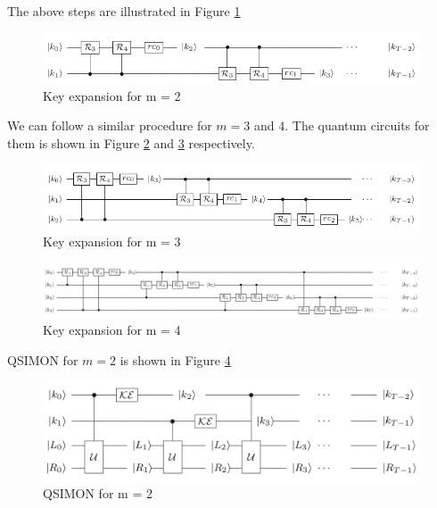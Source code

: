 \documentclass[preprint]{transcrypto}
\begin{document}
The above steps are illustrated in Figure \ref{fig:kem2}

\begin{figure}[h!]
    \centering
    \includegraphics[width=\linewidth]{simon/m2.png}
    \caption{Key expansion for m = 2 \cite{gos}}
    \label{fig:kem2}
\end{figure}

We can follow a similar procedure for $m= 3$ and $4$. The quantum circuits for them is shown in Figure \ref{fig:kem3} and \ref{fig:kem4} respectively.


\begin{figure}[h!]
    \centering
    \includegraphics[width=\linewidth]{simon/m3.png}
    \caption{Key expansion for m = 3 \cite{gos}}
    \label{fig:kem3}
\end{figure}


\begin{figure}[h!]
    \centering
    \includegraphics[width=\linewidth]{simon/m4.png}
    \caption{Key expansion for m = 4 \cite{gos}}
    \label{fig:kem4}
\end{figure}

QSIMON for $m=2$ is shown in Figure \ref{fig:qsim2}

\begin{figure}[h!]
    \centering
    \includegraphics[width=\linewidth]{simon/qsim2.png}
    \caption{QSIMON for m = 2 \cite{gos}}
    \label{fig:qsim2}
\end{figure}
\end{document}
